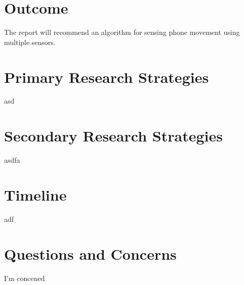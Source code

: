 \documentclass[11pt]{article}
\begin{document}
\section{Outcome}
The report will recommend an algorithm for sensing phone movement using multiple sensors.

\section{Primary Research Strategies}
asd

\section{Secondary Research Strategies}
asdfa

\section{Timeline}
adf

\section{Questions and Concerns}
I'm concened
\end{document}
